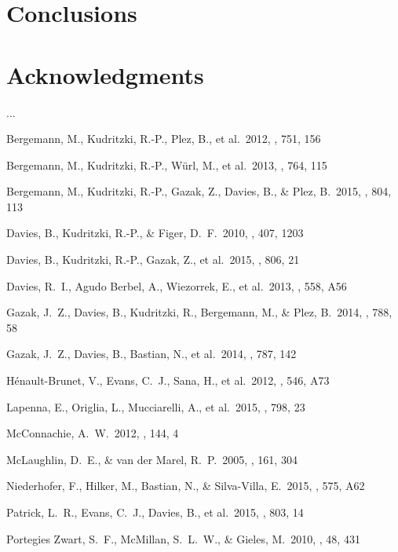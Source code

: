 \documentclass[useAMS,usenatbib]{mn2e}
\begin{document}

\section{Conclusions} %
\label{sec:conclusions}

\section*{Acknowledgments}

...


\begin{thebibliography}{99}

 Bergemann, M.,
Kudritzki, R.-P., Plez, B., et al.\ 2012, \apj, 751, 156

 Bergemann, M.,
Kudritzki, R.-P., W{\"u}rl, M., et al.\ 2013, \apj, 764, 115

 Bergemann, M.,
Kudritzki, R.-P., Gazak, Z., Davies, B., \& Plez, B.\ 2015, \apj, 804, 113

 Davies, B., Kudritzki,
R.-P., \& Figer, D.~F.\ 2010, \mnras, 407, 1203

 Davies, B., Kudritzki,
R.-P., Gazak, Z., et al.\ 2015, \apj, 806, 21

 Davies, R.~I., Agudo Berbel, A., Wiezorrek, E., et al.\ 2013, \aap, 558, A56

 Gazak, J.~Z., Davies, B.,
Kudritzki, R., Bergemann, M., \& Plez, B.\ 2014, \apj, 788, 58

 Gazak, J.~Z., Davies, B.,
Bastian, N., et al.\ 2014, \apj, 787, 142

 H{\'e}nault-Brunet, V., Evans, C.~J., Sana, H., et al.\ 2012, \aap, 546, A73

 Lapenna, E., Origlia,
L., Mucciarelli, A., et al.\ 2015, \apj, 798, 23

 McConnachie, A.~W.\ 2012,
\aj, 144, 4

 McLaughlin, D.~E., \& van der Marel, R.~P.\ 2005, \apjs, 161, 304

 Niederhofer, F., Hilker, M., Bastian, N., \& Silva-Villa, E.\ 2015, \aap, 575, A62

 Patrick, L.~R., Evans,
C.~J., Davies, B., et al.\ 2015, \apj, 803, 14

 Portegies Zwart, S.~F., McMillan, S.~L.~W., \& Gieles, M.\ 2010, \araa, 48, 431

\end{thebibliography}
\label{lastpage}
\end{document}
